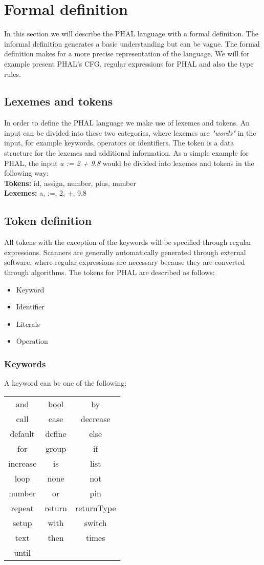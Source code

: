 \section{Formal definition} \label{FormalDefinition}
In this section we will describe the PHAL language with a formal definition. 
The informal definition generates a basic understanding but can be vague. 
The formal definition makes for a more precise representation of the language. 
We will for example present PHAL's CFG, regular expressions for PHAL and also the type rules.

\subsection{Lexemes and tokens}
In order to define the PHAL language we make use of lexemes and tokens. 
An input can be divided into these two categories, where lexemes are \textit{"words"} in the input, for example keywords, operators or identifiers. 
The token is a data structure for the lexemes and additional information. As a simple example for PHAL, the input \textit{a := 2 + 9.8} would be divided into lexemes and tokens in the following way:
\\
\textbf{Tokens:} id, assign, number, plus, number
\\
\textbf{Lexemes:} a, :=, 2, +, 9.8
\subsection{Token definition} 
All tokens with the exception of the keywords will be specified through regular expressions. 
Scanners are generally automatically generated through external software, where regular expressions are necessary because they are converted through algorithms.
The tokens for PHAL are described as follows:
\begin{itemize}
    \item Keyword
    \item Identifier
    \item Literals
    \item Operation
\end{itemize}
\subsubsection{Keywords}
A keyword can be one of the following:
\begin{center}
\begin{tabular}{c   c    c}
    and & bool & by \\
    call & case & decrease \\
    default & define & else \\
    for & group & if \\
    increase & is & list \\
    loop & none & not \\
    number & or & pin \\
    repeat & return & returnType \\
    setup & with & switch  \\
    text & then & times  \\
    until & &
\end{tabular}
\end{center}

